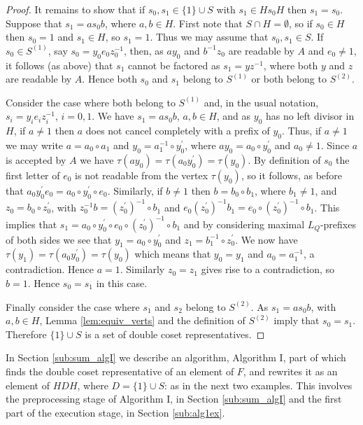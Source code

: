 \documentclass[a4paper,12pt]{article}
\renewcommand{\t}{\tau }
\numberwithin{equation}{section}
\numberwithin{figure}{section}
\begin{document}
\begin{proof}
It remains to show that if $s_0,s_1\in \{1\}\cup S$ with $s_1\in Hs_0H$
then $s_1=s_0$. Suppose that $s_1=as_0b$, where $a, b\in H$.
First note that $S\cap H=\emptyset$, so if $s_0\in H$ then $s_0=1$ and 
$s_1\in H$, so $s_1=1$. 
 Thus we may assume that $s_0,s_1\in S$. 
 If
$s_0\in S^{(1)}$, say $s_0=y_0e_0z_0^{-1}$, then, as $ay_0$ and
$b^{-1}z_0$ are readable by $A$ and $e_0\neq 1$, it follows (as
above) that $s_1$ cannot be factored as $s_1=yz^{-1}$, where both
$y$ and $z$ are readable by $A$. Hence both $s_0$ and $s_1$ belong
to $S^{(1)}$ or both belong to $S^{(2)}$.

Consider the case where both belong to $S^{(1)}$ and, in the usual notation,
$s_i=y_i e_i z_i^{-1}$, $i=0,1$. We have $s_1=as_0b$, $a,b\in H$, and as $y_0$ has
no left divisor in $H$, if $a\neq 1$ then $a$ does not cancel completely with
 a prefix of $y_0$. Thus, if $a\neq 1$ we may write $a=a_0\circ a_1$ and
$y_0=a_1^{-1}\circ y_0^\prime$, where $ay_0=a_0\circ y_0^\prime$
and $a_0\neq 1$. Since
$a$ is accepted by $A$ we have $\t(ay_0)=\t(a_0y_0^\prime)=\t(y_0)$. By definition
of $s_0$ the first letter of $e_0$ is not readable from the vertex $\t(y_0)$, so
it follows, as before that $a_0y_0^\prime e_0=a_0\circ y_0^\prime \circ e_0$. 
Similarly,
if $b\neq 1$ then $b=b_0\circ b_1$, where $b_1\neq 1$,  and $z_0=b_0\circ z_0^\prime$, with
$z_0^{-1}b= (z_0^\prime)^{-1}\circ b_1$ and $e_0 (z_0^\prime)^{-1}b_1=
e_0\circ  (z_0^\prime)^{-1}\circ b_1$. This implies that
$s_1=a_0\circ y_0^\prime \circ  e_0\circ  (z_0^\prime)^{-1}\circ b_1$ and by considering
maximal $L_Q$-prefixes of both sides we see that $y_1=a_0\circ y_0^\prime$ and
$z_1=b_1^{-1}\circ z_0^\prime$. We now have  $\t(y_1)=\t(a_0y_0^\prime)=\t(y_0)$ which
 means that
$y_0=y_1$ and $a_0=a_1^{-1}$,  a contradiction. Hence $a=1$.
Similarly $z_0=z_1$ gives rise to  a contradiction, so $b=1$.
Hence $s_0=s_1$ in this case.

Finally consider the case where $s_1$ and $s_2$ belong to
$S^{(2)}$. As $s_1=as_0b$, with $a,b\in H$, Lemma
\ref{lem:equiv_verts} and the definition of $S^{(2)}$ imply  that
$s_0= s_1$. Therefore $\{1\}\cup S$ is a set of double coset
representatives.
\end{proof}
In Section \ref{sub:sum_algI} we describe an algorithm, Algorithm I, part of 
which finds the double coset representative of an element of $F$, and 
rewrites it as an element of $HDH$, 
where $D=\{1\}\cup S$: as in the next two examples. This involves
the preprocessing stage of Algorithm I, in Section \ref{sub:sum_algI} and
the first part of the execution stage, in Section \ref{sub:alg1ex}. 
\end{document}
